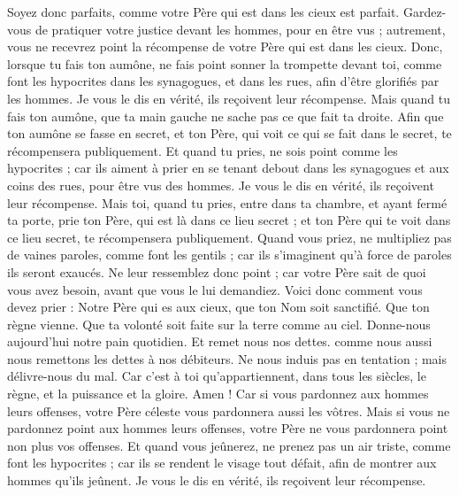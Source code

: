 \begin{multicols}{2}
Soyez donc parfaits, comme votre Père qui est dans les cieux est parfait.
\VerseOne{}Gardez-vous de pratiquer votre justice devant les hommes, pour en être vus ; autrement, vous ne recevrez point la récompense de votre Père qui est dans les cieux.
Donc, lorsque tu fais ton aumône, ne fais point sonner la trompette devant toi, comme font les hypocrites dans les synagogues, et dans les rues, afin d’être glorifiés par les hommes. Je vous le dis en vérité, ils reçoivent leur récompense.
Mais quand tu fais ton aumône, que ta main gauche ne sache pas ce que fait ta droite.
Afin que ton aumône se fasse en secret, et ton Père, qui voit ce qui se fait dans le secret, te récompensera publiquement.
Et quand tu pries, ne sois point comme les hypocrites ; car ils aiment à prier en se tenant debout dans les synagogues et aux coins des rues, pour être vus des hommes. Je vous le dis en vérité, ils reçoivent leur récompense.
Mais toi, quand tu pries, entre dans ta chambre, et ayant fermé ta porte, prie ton Père, qui est là dans ce lieu secret ; et ton Père qui te voit dans ce lieu secret, te récompensera publiquement.
Quand vous priez, ne multipliez pas de vaines paroles, comme font les gentils ; car ils s'imaginent qu’à force de paroles ils seront exaucés.
Ne leur ressemblez donc point ; car votre Père sait de quoi vous avez besoin, avant que vous le lui demandiez.
Voici donc comment vous devez prier : Notre Père qui es aux cieux, que ton Nom soit sanctifié.
Que ton règne vienne. Que ta volonté soit faite sur la terre comme au ciel.
Donne-nous aujourd'hui notre pain quotidien.
Et remet nous nos dettes{}. comme nous aussi nous remettons les dettes à nos débiteurs.
Ne nous induis pas en tentation ; mais délivre-nous du mal. Car c’est à toi qu’appartiennent, dans tous les siècles, le règne, et la puissance et la gloire. Amen !
Car si vous pardonnez aux hommes leurs offenses, votre Père céleste vous pardonnera aussi les vôtres.
Mais si vous ne pardonnez point aux hommes leurs offenses, votre Père ne vous pardonnera point non plus vos offenses.
Et quand vous jeûnerez, ne prenez pas un air triste, comme font les hypocrites ; car ils se rendent le visage tout défait, afin de montrer aux hommes qu'ils jeûnent. Je vous le dis en vérité, ils reçoivent leur récompense.

\end{multicols}
